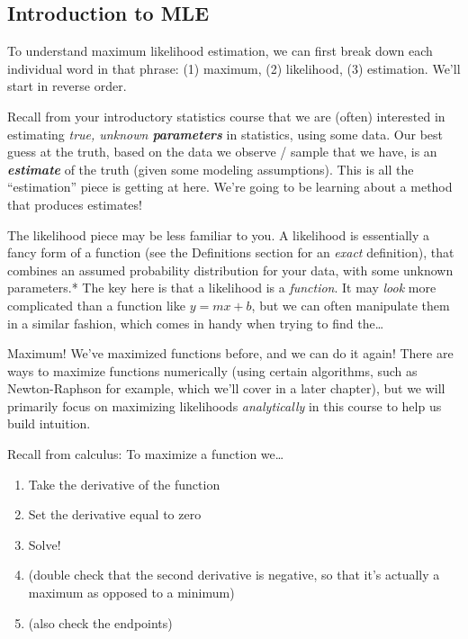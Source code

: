 \documentclass[
  letterpaper,
  DIV=11,
  numbers=noendperiod]{scrreprt}
\begin{document}
\hypertarget{introduction-to-mle}{%
\subsection*{Introduction to MLE}\label{introduction-to-mle}}

To understand maximum likelihood estimation, we can first break down
each individual word in that phrase: (1) maximum, (2) likelihood, (3)
estimation. We'll start in reverse order.

Recall from your introductory statistics course that we are (often)
interested in estimating \emph{true, unknown \textbf{parameters}} in
statistics, using some data. Our best guess at the truth, based on the
data we observe / sample that we have, is an \textbf{\emph{estimate}} of
the truth (given some modeling assumptions). This is all the
``estimation'' piece is getting at here. We're going to be learning
about a method that produces estimates!

The likelihood piece may be less familiar to you. A likelihood is
essentially a fancy form of a function (see the Definitions section for
an \emph{exact} definition), that combines an assumed probability
distribution for your data, with some unknown parameters.* The key here
is that a likelihood is a \emph{function}. It may \emph{look} more
complicated than a function like \(y = mx + b\), but we can often
manipulate them in a similar fashion, which comes in handy when trying
to find the\ldots{}

Maximum! We've maximized functions before, and we can do it again! There
are ways to maximize functions numerically (using certain algorithms,
such as Newton-Raphson for example, which we'll cover in a later
chapter), but we will primarily focus on maximizing likelihoods
\emph{analytically} in this course to help us build intuition.

Recall from calculus: To maximize a function we\ldots{}

\begin{enumerate}
\def\labelenumi{\arabic{enumi}.}
\item
  Take the derivative of the function
\item
  Set the derivative equal to zero
\item
  Solve!
\item
  (double check that the second derivative is negative, so that it's
  actually a maximum as opposed to a minimum)
\item
  (also check the endpoints)
\end{enumerate}
\end{document}

